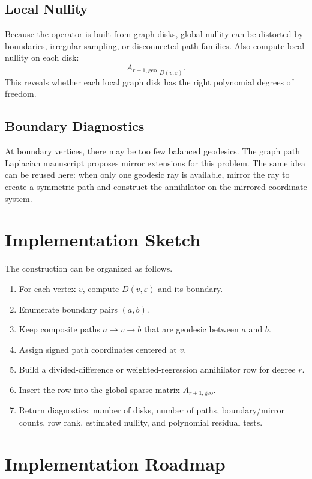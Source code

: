 \documentclass[11pt]{article}
\newcommand{\eps}{\varepsilon}
\begin{document}
\subsection{Local Nullity}

Because the operator is built from graph disks, global nullity can be distorted
by boundaries, irregular sampling, or disconnected path families.  Also compute
local nullity on each disk:
\[
  A_{r+1,\mathrm{geo}}|_{D(v,\eps)}.
\]
This reveals whether each local graph disk has the right polynomial degrees of
freedom.

\subsection{Boundary Diagnostics}

At boundary vertices, there may be too few balanced geodesics.  The graph path
Laplacian manuscript proposes mirror extensions for this problem.  The same
idea can be reused here: when only one geodesic ray is available, mirror the
ray to create a symmetric path and construct the annihilator on the mirrored
coordinate system.

\section{Implementation Sketch}

The construction can be organized as follows.

\begin{enumerate}
  \item For each vertex \(v\), compute \(D(v,\eps)\) and its boundary.
  \item Enumerate boundary pairs \((a,b)\).
  \item Keep composite paths \(a\to v\to b\) that are geodesic between \(a\)
        and \(b\).
  \item Assign signed path coordinates centered at \(v\).
  \item Build a divided-difference or weighted-regression annihilator row for
        degree \(r\).
  \item Insert the row into the global sparse matrix
        \(A_{r+1,\mathrm{geo}}\).
  \item Return diagnostics: number of disks, number of paths, boundary/mirror
        counts, row rank, estimated nullity, and polynomial residual tests.
\end{enumerate}

\section{Implementation Roadmap}
\end{document}
